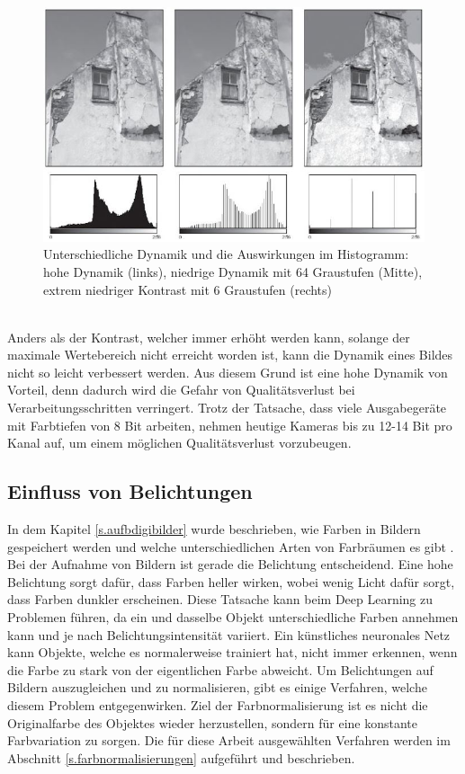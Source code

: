  \begin{figure}
    [h]
    \centering
    \includegraphics[scale=0.7]{Sources/dynamik.JPG}
    \caption{Unterschiedliche Dynamik und die Auswirkungen im Histogramm: hohe Dynamik (links), niedrige Dynamik mit 64 Graustufen (Mitte), extrem niedriger Kontrast mit 6 Graustufen (rechts)\cite[45]{burger2009digitale}}
    \label{img:dynamik}
  \end{figure}\\
Anders als der Kontrast, welcher immer erhöht werden kann, solange der maximale Wertebereich nicht erreicht worden ist, kann die Dynamik eines Bildes nicht so leicht verbessert werden. Aus diesem Grund ist eine hohe Dynamik von Vorteil, denn dadurch wird die Gefahr von Qualitätsverlust bei Verarbeitungsschritten verringert. Trotz der Tatsache, dass viele Ausgabegeräte mit Farbtiefen von 8 Bit arbeiten, nehmen heutige Kameras bis zu 12-14 Bit pro Kanal auf, um einem möglichen Qualitätsverlust vorzubeugen.
\subsection{Einfluss von Belichtungen}\label{s.belichtung}
In dem Kapitel \ref{s.aufbdigibilder} wurde beschrieben, wie Farben in Bildern gespeichert werden und welche unterschiedlichen Arten von Farbräumen es gibt \cite[41ff.]{burger2009digitale}. Bei der Aufnahme von Bildern ist gerade die Belichtung entscheidend. Eine hohe Belichtung sorgt dafür, dass Farben heller wirken, wobei wenig Licht dafür sorgt, dass Farben dunkler erscheinen. Diese Tatsache kann beim Deep Learning zu Problemen führen, da ein und dasselbe Objekt unterschiedliche Farben annehmen kann und je nach Belichtungsintensität variiert. Ein künstliches neuronales Netz kann Objekte, welche es normalerweise trainiert hat, nicht immer erkennen, wenn die Farbe zu stark von der eigentlichen Farbe abweicht. Um Belichtungen auf Bildern auszugleichen und zu normalisieren, gibt es einige Verfahren, welche diesem Problem entgegenwirken. Ziel der Farbnormalisierung ist es nicht die Originalfarbe des Objektes wieder herzustellen, sondern für eine konstante Farbvariation zu sorgen. Die für diese Arbeit ausgewählten Verfahren werden im Abschnitt \ref{s.farbnormalisierungen} aufgeführt und beschrieben. 
